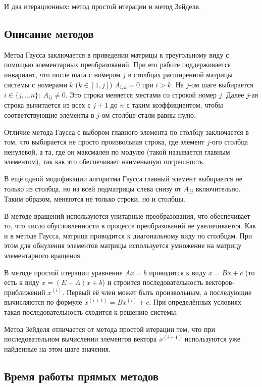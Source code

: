 \documentclass{article}
\begin{document}
И два итерационных: метод простой итерации и метод Зейделя.

\subsection{Описание методов}

Метод Гаусса заключается в приведении матрицы к треугольному виду с помощью элементарных преобразований. При его работе поддерживается инвариант, что после шага с номером $j$ в столбцах расширенной матрицы системы с номерами $k$ ($k \in [1, j]$) $A_{i, k} = 0$ при $i > k$.
На $j$-ом шаге выбирается $i \in \{j, \dots n\} :\ A_{ij} \ne 0$. Это строка меняется местами со строкой номер $j$. Далее $j$-ая строка вычитается из всех с $j+1$ до $n$ с таким коэффициентом, чтобы соответствующие элементы в $j$-ом столбце стали равны нулю.

Отличие метода Гаусса с выбором главного элемента по столбцу заключается в том, что выбирается не просто произвольная строка, где элемент $j$-ого столбца ненулевой, а та, где он максмален по модулю (такой называется главным элементом), так как это обеспечивает наименьшую погрешность.

В ещё одной модификации алгоритма Гаусса главный элемент выбирается не только из столбца, но из всей подматрицы слева снизу от $A_{jj}$ включительно. Таким образом, меняются не только строки, но и столбцы.

В методе вращений используются унитарные преобразования, что обеспечивает то, что число обусловленности в процессе преобразований не увеличивается. Как и в методе Гаусса, матрица приводится к диагональному виду по столбцам. При этом для обнуления элементов матрицы используется умножение на матрицу элементарного вращения.

В методе простой итерации уравнение $Ax = b$ приводится к виду $x = Bx + c$ (то есть к виду $x = (E-A) x + b$) и строится последовательность векторов-приближений $x^{(i)}$. Первый её член может быть произвольным, а последующие вычисляются по формуле $ x^{(i+1)} = Bx^{(i)} + c $. При определённых условиях такая последовательность сходится к решению системы.

Метод Зейделя отличается от метода простой итерации тем, что при последовательном вычислении элементов вектора $x^{(i+1)}$ используются уже найденные на этом шаге значения.

\subsection{Время работы прямых методов}
\end{document}
